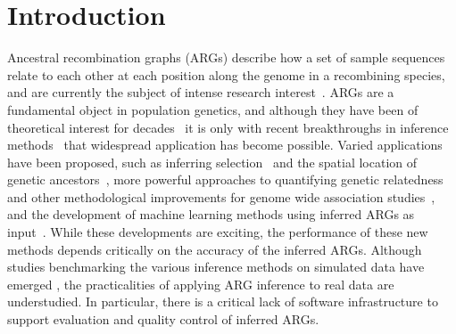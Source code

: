 \documentclass[unnumsec,webpdf,contemporary,large,namedate]{oup-authoring-template}%
\begin{document}
 \maketitle 

\section{Introduction}
Ancestral recombination graphs (ARGs) describe how a set of sample
sequences relate to each other at each position along the genome in a
recombining
species, and are currently the subject of intense research
interest~\citep{brandt2024promise,lewanski2024era,nielsen2024inference,
wong2024general}. ARGs are a fundamental object in population genetics,
and although they have been of theoretical interest for
decades~\citep{Hudson1983,Griffiths1996,Griffiths1997} it is only with recent breakthroughs
in inference methods~\citep{rasmussen2014genome,speidel2019method,kelleher2019inferring,
wohns2022unified,zhang2023biobank,gunnarsson2024scalable,deng2024robust} that 
widespread application has become possible. Varied applications have been proposed,
such as inferring selection~\citep{stern2019approximate,hejase2022deep} and
the spatial location of genetic ancestors~\citep{osmond2024estimating,deraje2024inferring,grundler2025geographic},
more powerful approaches to quantifying genetic
relatedness~\citep{fan2022genealogical,zhang2023biobank,gunnarsson2024scalable,lehmann2025on}
and other methodological improvements for genome wide association
studies~\citep{nowbandegani2023extremely,link2023tree},
and the development of machine learning methods using inferred
ARGs as input~\citep{hejase2022deep,pearson2023local,korfmann2024simultaneous,
whitehouse2024tree}.
While these developments are exciting, the performance 
of these new methods depends critically on the accuracy of the inferred ARGs.
Although studies benchmarking the various inference methods on 
simulated data have emerged 
\citep{brandt2022evaluation,deng2024robust,peng2024evaluating},
the practicalities of applying ARG inference to real data are 
understudied. In particular, there is a critical lack of software 
infrastructure to support evaluation and quality control of 
inferred ARGs.
\end{document}
